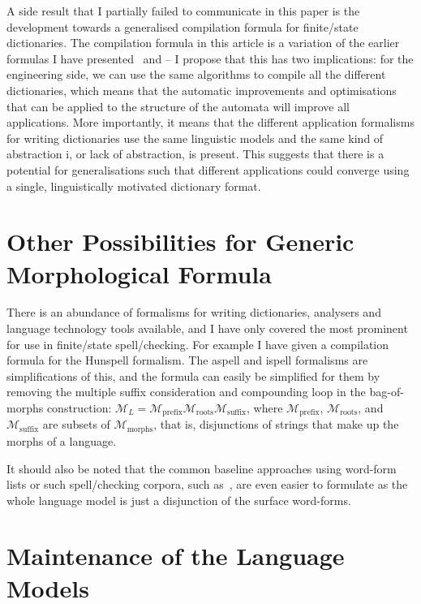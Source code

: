 \documentclass[officiallayout,final]{unihelcompling}
\begin{document}
A side result that I partially failed to communicate in this paper is the
development towards a generalised compilation formula for finite\-/state
dictionaries. The compilation formula in this article is a variation of the
earlier formulas I have presented~\citep{linden2009hfst} and
 -- I propose that this has two implications:
for the engineering side, we can use the same algorithms to compile all the
different dictionaries, which means that the automatic improvements and
optimisations that can be applied to the structure of the automata will improve
all applications. More importantly, it means that the different application
formalisms for writing dictionaries use the same linguistic models and the same
kind of abstraction i, or lack of abstraction, is present. This suggests that
there is a potential for generalisations such that different applications could
converge using a single, linguistically motivated dictionary format.

\section{Other Possibilities for Generic Morphological Formula}
\label{sec:other-lms}

There is an abundance of formalisms for writing dictionaries, analysers and
language technology tools available, and I have only covered the most prominent
for use in finite\-/state spell\-/checking. For example I have given a
compilation formula for the Hunspell formalism. The aspell and ispell
formalisms are simplifications of this, and the formula can easily be
simplified for them by removing the multiple suffix consideration and
compounding loop in the bag-of-morphs construction: $\mathcal{M}_L =
\mathcal{M}_\mathrm{prefix} \mathcal{M}_\mathrm{roots}
\mathcal{M}_\mathrm{suffix}$, where $\mathcal{M}_\mathrm{prefix}$,
$\mathcal{M}_\mathrm{roots}$, and $\mathcal{M}_\mathrm{suffix}$ are subsets of
$\mathcal{M}_\mathrm{morphs}$, that is, disjunctions of strings that make up
the morphs of a language.

It should also be noted that the common baseline approaches using word-form
lists or such spell\-/checking corpora, such as~\citet{norvig2010howto}, are
even easier to formulate as the whole language model is just a disjunction of
the surface word-forms.

\section{Maintenance of the Language Models}
\label{sec:maintenance}
\end{document}
